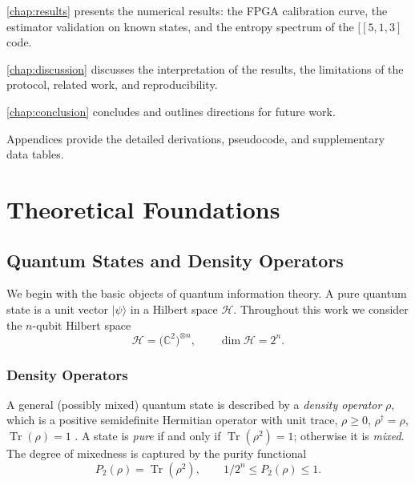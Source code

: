 \documentclass[12pt,a4paper,oneside]{book}
\theoremstyle{plain}
\theoremstyle{definition}
\theoremstyle{remark}
\begin{document}
\cref{chap:results} presents the numerical results: the FPGA calibration curve, the estimator validation on known states, and the entropy spectrum of the $[[5,1,3]$ code.

\cref{chap:discussion} discusses the interpretation of the results, the limitations of the protocol, related work, and reproducibility.

\cref{chap:conclusion} concludes and outlines directions for future work.

Appendices provide the detailed derivations, pseudocode, and supplementary data tables.

\chapter{Theoretical Foundations}
\label{chap:foundations}

\section{Quantum States and Density Operators}
\label{sec:quantum_states}

We begin with the basic objects of quantum information theory. A pure quantum state is a unit vector $|\psi\rangle$ in a Hilbert space $\mathcal{H}$. Throughout this work we consider the $n$-qubit Hilbert space
\begin{equation}
    \mathcal{H} = \bigl(\mathbb{C}^2\bigr)^{\otimes n}, \qquad \dim \mathcal{H} = 2^n.
\end{equation}

\subsection{Density Operators}

A general (possibly mixed) quantum state is described by a \emph{density operator} $\rho$, which is a positive semidefinite Hermitian operator with unit trace, $\rho \geq 0$, $\rho^\dagger = \rho$, $\operatorname{Tr}(\rho) = 1$ \cite{nielsen2010quantum}. A state is \emph{pure} if and only if $\operatorname{Tr}(\rho^2) = 1$; otherwise it is \emph{mixed}. The degree of mixedness is captured by the purity functional
\begin{equation}
    P_2(\rho) = \operatorname{Tr}(\rho^2), \qquad 1/2^{n} \leq P_2(\rho) \leq 1.
\end{equation}
\end{document}
